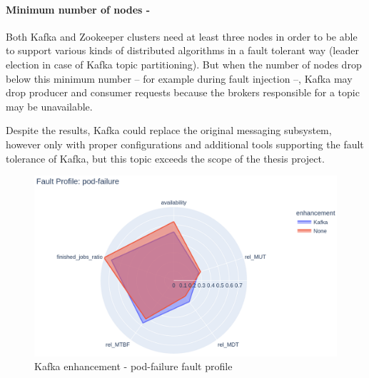 \paragraph{Minimum number of nodes -}Both Kafka and Zookeeper clusters need at least three nodes in order to be able to support various kinds of distributed algorithms in a fault tolerant way (\eg leader election in case of Kafka topic partitioning). But when the number of nodes drop below this minimum number -- for example during fault injection --, Kafka may drop producer and consumer requests because the brokers responsible for a topic may be unavailable.

Despite the results, Kafka could replace the original messaging subsystem, however only with proper configurations and additional tools supporting the fault tolerance of Kafka, but this topic exceeds the scope of the thesis project.

\begin{figure}[h]
	\centering
	\includegraphics[width=140mm, keepaspectratio]{figures/kafka_with_base_pod-failure.png}
	\caption{Kafka enhancement - pod-failure fault profile}
	\label{fig:kafka-results-pod-failure}
\end{figure}


